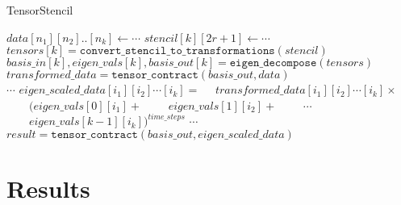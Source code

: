 \documentclass{article}
\begin{document}
\begin{algorithm}[H]
	\caption{TensorStencil}\label{euclid}
	\begin{algorithmic}[1]
	\State $\textit{data}[n_1][n_2]..[n_k] \gets \cdots$ 
	\State $\textit{stencil}[k][2r+1] \gets \cdots$ \\
	\State $\textit{tensors}[k] = \texttt{convert\_stencil\_to\_transformations}(\textit{stencil})$
	\State $\textit{basis\_in}[k],\textit{eigen\_vals}[k], \textit{basis\_out}[k] = \texttt{eigen\_decompose}(\textit{tensors})$ \\
	\State $\textit{transformed\_data} = \texttt{tensor\_contract}(\textit{basis\_out},\textit{data})$ \\
	\State $\cdots$
	\State $\textit{eigen\_scaled\_data}[i_1][i_2]\cdots[i_k] = $
	\State $\quad \textit{transformed\_data}[i_1][i_2]\cdots[i_k] \times $
	\State $\quad \quad (\textit{eigen\_vals}[0][i_1] + $
	\State $\quad \quad \textit{eigen\_vals}[1][i_2] + $
	\State $\quad \quad \cdots$
	\State $\quad \quad \textit{eigen\_vals}[k-1][i_k])^{\textit{time\_steps}}$
	\EndFor 
	\State $\cdots$
	\EndFor 
	\EndFor \\
	\State $\textit{result} = \texttt{tensor\_contract}(\textit{basis\_out},\textit{eigen\_scaled\_data})$
	\end{algorithmic}
\end{algorithm}

\section{Results}


\end{document}
